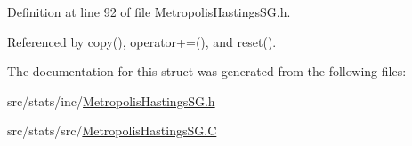 Definition at line 92 of file Metropolis\-Hastings\-S\-G.\-h.



Referenced by copy(), operator+=(), and reset().



The documentation for this struct was generated from the following files\-:\begin{DoxyCompactItemize}
\item 
src/stats/inc/\hyperlink{_metropolis_hastings_s_g_8h}{Metropolis\-Hastings\-S\-G.\-h}\item 
src/stats/src/\hyperlink{_metropolis_hastings_s_g_8_c}{Metropolis\-Hastings\-S\-G.\-C}\end{DoxyCompactItemize}
